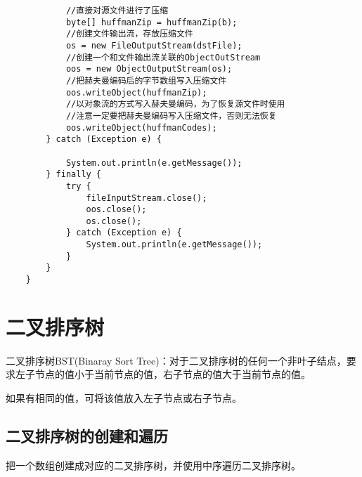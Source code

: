 \documentclass[a4paper]{report}
\begin{document}
\begin{lstlisting}
            //直接对源文件进行了压缩
            byte[] huffmanZip = huffmanZip(b);
            //创建文件输出流，存放压缩文件
            os = new FileOutputStream(dstFile);
            //创建一个和文件输出流关联的ObjectOutStream
            oos = new ObjectOutputStream(os);
            //把赫夫曼编码后的字节数组写入压缩文件
            oos.writeObject(huffmanZip);
            //以对象流的方式写入赫夫曼编码，为了恢复源文件时使用
            //注意一定要把赫夫曼编码写入压缩文件，否则无法恢复
            oos.writeObject(huffmanCodes);
        } catch (Exception e) {

            System.out.println(e.getMessage());
        } finally {
            try {
                fileInputStream.close();
                oos.close();
                os.close();
            } catch (Exception e) {
                System.out.println(e.getMessage());
            }
        }
    }
\end{lstlisting}
\chapter{二叉排序树}
二叉排序树BST(Binaray Sort Tree)：对于二叉排序树的任何一个非叶子结点，要求左子节点的值小于当前节点的值，右子节点的值大于当前节点的值。

如果有相同的值，可将该值放入左子节点或右子节点。
\section{二叉排序树的创建和遍历}
把一个数组创建成对应的二叉排序树，并使用中序遍历二叉排序树。
\end{document}
